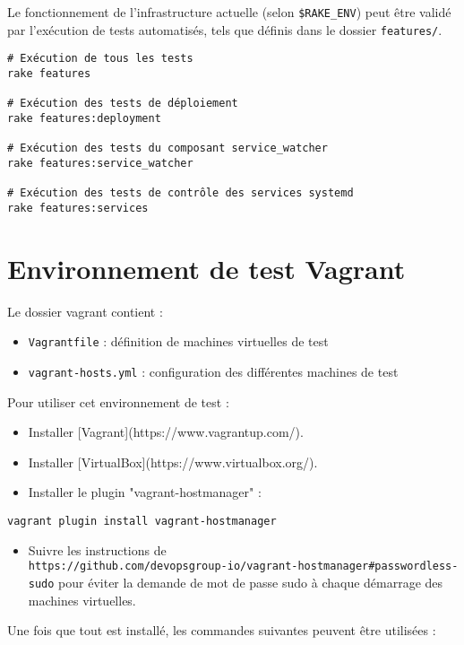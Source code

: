 \documentclass[a4paper,oneside,12pt]{article}
\begin{document}
Le fonctionnement de l'infrastructure actuelle (selon \verb!$RAKE_ENV!) peut être
validé par l'exécution de tests automatisés, tels que définis dans le dossier
\verb!features/!.

\begin{verbatim}
# Exécution de tous les tests
rake features

# Exécution des tests de déploiement
rake features:deployment

# Exécution des tests du composant service_watcher
rake features:service_watcher

# Exécution des tests de contrôle des services systemd
rake features:services
\end{verbatim}

\pagebreak
\section{Environnement de test Vagrant}

Le dossier vagrant contient :
\begin{itemize}
	\item  \verb!Vagrantfile! : définition de machines virtuelles de test
	\item  \verb!vagrant-hosts.yml! : configuration des différentes machines de test
\end{itemize}

Pour utiliser cet environnement de test :

\begin{itemize}
\item Installer [Vagrant](https://www.vagrantup.com/).
\item Installer [VirtualBox](https://www.virtualbox.org/).
\item Installer le plugin "vagrant-hostmanager" :
\end{itemize}

\begin{verbatim}
vagrant plugin install vagrant-hostmanager
\end{verbatim}

\begin{itemize}
\item Suivre les instructions de \\
	\texttt{https://github.com/devopsgroup-io/vagrant-hostmanager\#passwordless-sudo} pour éviter la demande de mot de passe sudo à chaque démarrage des machines virtuelles.
\end{itemize}
Une fois que tout est installé, les commandes suivantes peuvent être utilisées :
\end{document}
